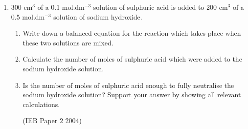 \begin{eocexercises}{}
\begin{enumerate}
\item{300 cm$^{3}$ of a 0.1 mol.dm$^{-3}$ solution of sulphuric acid is added to 200 cm$^{3}$ of a 0.5 mol.dm$^{-3}$ solution of sodium hydroxide.}
\begin{enumerate}
\item{Write down a balanced equation for the reaction which takes place when these two solutions are mixed.}
\item{Calculate the number of moles of sulphuric acid which were added to the sodium hydroxide solution.}
\item{Is the number of moles of sulphuric acid enough to fully neutralise the sodium hydroxide solution? Support your  answer by showing all relevant calculations.}

(IEB Paper 2 2004)
\end{enumerate}


\end{enumerate}
\end{eocexercises}
